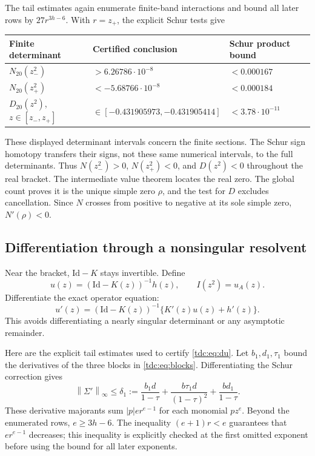 \documentclass[11pt]{article}
\theoremstyle{definition}\newtheorem{definition}[theorem]{Definition}
\theoremstyle{remark}\newtheorem{remark}[theorem]{Remark}
\newcommand{\Id}{\mathrm{Id}}
\newcommand{\norm}[1]{\left\lVert#1\right\rVert}
\begin{document}
The tail estimates again enumerate finite-band interactions and bound all later rows by $27r^{3h-6}$. With $r=z_+$, the explicit Schur tests give
\begin{center}
\begin{tabular}{lll}
\toprule
Finite determinant&Certified conclusion&Schur product bound\\
\midrule
$N_{20}(z_-^2)$&$>6.26786\cdot10^{-8}$&$<0.000167$\\
$N_{20}(z_+^2)$&$<-5.68766\cdot10^{-8}$&$<0.000184$\\
$D_{20}(z^2)$, $z\in[z_-,z_+]$&$\in[-0.431905973,-0.431905414]$&$<3.78\cdot10^{-11}$\\
\bottomrule
\end{tabular}
\end{center}
These displayed determinant intervals concern the finite sections. The Schur sign homotopy transfers their signs, not these same numerical intervals, to the full determinants. Thus $N(z_-^2)>0$, $N(z_+^2)<0$, and $D(z^2)<0$ throughout the real bracket. The intermediate value theorem locates the real zero. The global count proves it is the unique simple zero $\rho$, and the test for $D$ excludes cancellation. Since $N$ crosses from positive to negative at its sole simple zero, $N'(\rho)<0$.

\subsection{Differentiation through a nonsingular resolvent}
Near the bracket, $\Id-K$ stays invertible. Define
\[
 u(z)=(\Id-K(z))^{-1}h(z),\qquad I(z^2)=u_A(z).
\]
Differentiate the exact operator equation:
\begin{equation}\label{tdc:eq:du}
 u'(z)=(\Id-K(z))^{-1}\{K'(z)u(z)+h'(z)\}.
\end{equation}
This avoids differentiating a nearly singular determinant or any asymptotic remainder.

Here are the explicit tail estimates used to certify \eqref{tdc:eq:du}. Let $b_1,d_1,\tau_1$ bound the derivatives of the three blocks in \eqref{tdc:eq:blocks}. Differentiating the Schur correction gives
\begin{equation}\label{tdc:eq:deltaslope}
 \norm{\Sigma'}_\infty\le\delta_1:=%
 \frac{b_1d}{1-\tau}+\frac{b\tau_1d}{(1-\tau)^2}
 +\frac{bd_1}{1-\tau}.
\end{equation}
These derivative majorants sum $|p|e r^{e-1}$ for each monomial $pz^e$. Beyond the enumerated rows, $e\ge3h-6$. The inequality $(e+1)r<e$ guarantees that $e r^{e-1}$ decreases; this inequality is explicitly checked at the first omitted exponent before using the bound for all later exponents.
\end{document}
